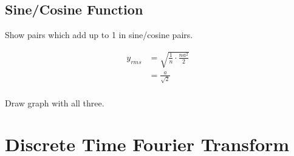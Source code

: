 \documentclass{exam}
\begin{document}
  \subsection{Sine/Cosine Function}
  Show pairs which add up to 1 in sine/cosine pairs.

  \begin{align*}
    y_{rms} & = \sqrt{\frac{1}{n} \cdot \frac{na^2}{2} } \\
            & = \frac{a}{\sqrt{2}} \\
  \end{align*}

  Draw graph with all three.

  \section{Discrete Time Fourier Transform}
\end{document}
